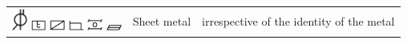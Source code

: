 \documentclass[british,final,landscape]{scrartcl}
\begin{document}
\begin{refsection}
\begin{supertabular}{p{0.3\textwidth}p{0.34\textwidth}p{0.34\textwidth}}
   \includegraphics[width=5mm]{Metals/SheetMetal} \includegraphics[width=5mm]{Metals/SheetMetal2} \includegraphics[width=5mm]{Metals/SheetMetal3} \includegraphics[width=5mm]{Metals/SheetMetal4} \includegraphics[width=5mm]{Metals/SheetMetal5} \includegraphics[width=5mm]{Metals/SheetMetal6} & Sheet metal & irrespective of the identity of the metal \\

\end{supertabular}
\end{refsection}
\end{document}
